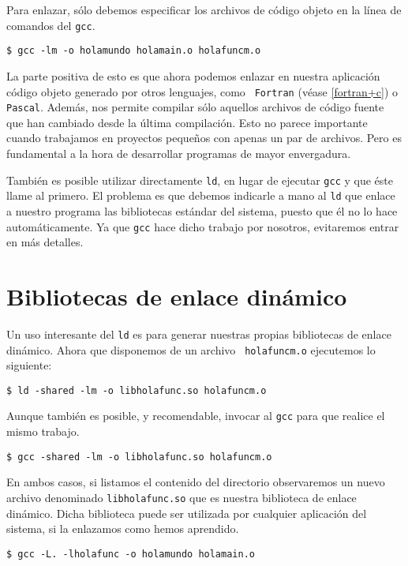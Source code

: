 Para enlazar, sólo debemos especificar los archivos de código objeto en
la línea de comandos del {\tt gcc}.

\begin{verbatim}
$ gcc -lm -o holamundo holamain.o holafuncm.o
\end{verbatim}

La parte positiva de esto es que ahora podemos enlazar en nuestra
aplicación código objeto generado por otros lenguajes, como {\tt
Fortran} (véase \ref{fortran+c}) o {\tt Pascal}. Además, nos permite
compilar sólo aquellos archivos de código fuente que han cambiado desde
la última compilación. Esto no parece importante cuando trabajamos en
proyectos pequeños con apenas un par de archivos. Pero es fundamental a
la hora de desarrollar programas de mayor envergadura.

También es posible utilizar directamente {\tt ld}, en lugar de
ejecutar {\tt gcc} y que éste llame al primero. El problema es que
debemos indicarle a mano al {\tt ld} que enlace a nuestro programa
las bibliotecas estándar del sistema, puesto que él no lo hace
automáticamente. Ya que {\tt gcc} hace dicho trabajo por nosotros,
evitaremos entrar en más detalles.

\section{Bibliotecas de enlace dinámico}

Un uso interesante del {\tt ld} es para generar nuestras propias
bibliotecas de enlace dinámico. Ahora que disponemos de un archivo {\tt
holafuncm.o} ejecutemos lo siguiente:

\begin{verbatim}
$ ld -shared -lm -o libholafunc.so holafuncm.o
\end{verbatim}

Aunque también es posible, y recomendable, invocar al {\tt gcc} para que
realice el mismo trabajo.

\begin{verbatim}
$ gcc -shared -lm -o libholafunc.so holafuncm.o
\end{verbatim}

En ambos casos, si listamos el contenido del directorio observaremos un
nuevo archivo denominado {\tt libholafunc.so} que es nuestra biblioteca
de enlace dinámico. Dicha biblioteca puede ser utilizada por cualquier
aplicación del sistema, si la enlazamos como hemos aprendido.

\begin{verbatim}
$ gcc -L. -lholafunc -o holamundo holamain.o
\end{verbatim}

